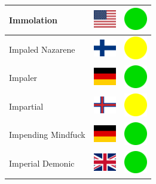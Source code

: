 \documentclass[12pt, a4paper, twoside]{report}
\begin{document}
\begin{center}
\begin{longtable}{|p{5cm}|p{2cm}|p{2cm}|}
 Immolation                                                 & \includegraphics[width=1cm]{../4x3/us} &   \includegraphics[width=1cm]{../likes/y} \\ \hline
 Impaled Nazarene                                           & \includegraphics[width=1cm]{../4x3/fi} &   \includegraphics[width=1cm]{../likes/m} \\ \hline
 Impaler                                                    & \includegraphics[width=1cm]{../4x3/de} &   \includegraphics[width=1cm]{../likes/y} \\ \hline
 Impartial                                                  & \includegraphics[width=1cm]{../4x3/fo} &   \includegraphics[width=1cm]{../likes/m} \\ \hline
 Impending Mindfuck                                         & \includegraphics[width=1cm]{../4x3/de} &   \includegraphics[width=1cm]{../likes/y} \\ \hline
 Imperial Demonic                                           & \includegraphics[width=1cm]{../4x3/gb} &   \includegraphics[width=1cm]{../likes/y} \\ \hline

\end{longtable}
\end{center}
\end{document}
